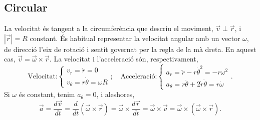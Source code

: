 \subsection{Circular}
La velocitat és tangent a la circumferència que descriu el moviment, $\vec v\perp\vec r$, i $|\vec r|=R$ constant. És habitual representar la velocitat angular amb un vector $\omega$, de direcció l'eix de rotació i sentit governat per la regla de la mà dreta. En aquest cas, $\vec v=\vec\omega\times\vec r$. La velocitat i l'acceleració són, respectivament,
\[
\text{Velocitat:}
\begin{cases}
v_r=\dot r=0\\
v_\theta=r\dot\theta=\omega R
\end{cases}
;\quad
\text{Acceleració:}
\begin{cases}
a_r=\ddot r - r\dot\theta^2=-r\omega^2\\
a_\theta=r\ddot\theta + 2\dot r\dot\theta=r\dot\omega
\end{cases}.
\]
Si $\omega$ és constant, tenim $a_\theta=0$, i aleshores,\[\vec a=\dfrac{d\vec v}{dt}=\dfrac{d}{dt}(\vec\omega\times\vec r)=\vec\omega\times\dfrac{d\vec r}{dt}=\vec\omega\times\vec v=\vec\omega\times(\vec\omega\times\vec r).\]